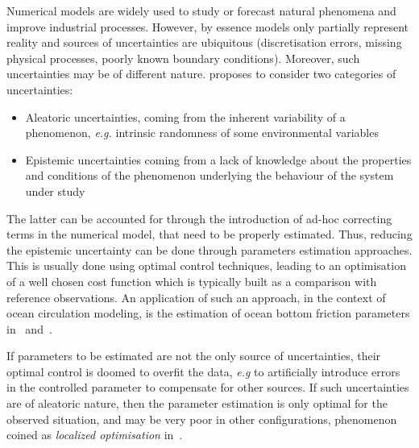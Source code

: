 \documentclass[../../Main_ManuscritThese.tex]{subfiles}
\begin{document}
\TitleBtwLines


{}
\label{chap:Introduction}
\pagestyle{introStyle}




Numerical models are widely used to study or forecast natural
phenomena and improve industrial processes. However, by essence models
only partially represent reality and sources of uncertainties are
ubiquitous (discretisation errors, missing physical processes, poorly
known boundary conditions).  Moreover, such uncertainties may be of
different nature. \cite{walker_defining_2003} proposes to consider two
categories of uncertainties:
\begin{itemize}
\item Aleatoric uncertainties, coming from the inherent variability of
a phenomenon, \emph{e.g.} intrinsic randomness of some environmental
variables
\item Epistemic uncertainties coming from a lack of knowledge about
the properties and conditions of the phenomenon underlying the
behaviour of the system under study
\end{itemize} The latter can be accounted for through the introduction
of ad-hoc correcting terms in the numerical model, that need to be
properly estimated. Thus, reducing the epistemic uncertainty can be
done through parameters estimation approaches. This is usually done
using optimal control techniques, leading to an optimisation of a well
chosen cost function which is typically built as a comparison with
reference observations.
  An application of such an approach, in the context of ocean
circulation modeling, is the estimation of ocean bottom friction
parameters in~\cite{das_estimation_1991}
and~\cite{boutet_estimation_2015}.

  If parameters to be estimated are not the only source of
uncertainties, their optimal control is doomed to overfit the data,
\emph{e.g} to artificially introduce errors in the controlled
parameter to compensate for other sources. If such uncertainties are
of aleatoric nature, then the parameter estimation is only optimal for
the observed situation, and may be very poor in other configurations,
phenomenon coined as \textit{localized optimisation}
in~\cite{huyse_free-form_2001}.
  
\end{document}
